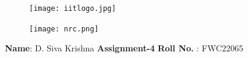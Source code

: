 \documentclass[10pt,a4paper]{report}
\begin{document}
\begin{figure}[!tbp]
  \centering
  \begin{minipage}[b]{0.4\textwidth}
    \texttt{[image: iitlogo.jpg]}
  \end{minipage}
  \hfill
  \vspace{5mm}\begin{minipage}[b]{0.4\textwidth}
\raggedleft  \texttt{[image: nrc.png]}\

  \end{minipage}\vspace{0.2cm}
\end{figure}
\raggedright \textbf{Name}:\hspace{1mm} D. Siva Krishna\hspace{3cm} \Large \textbf{Assignment-4}\hspace{2.5cm} %
\normalsize \textbf{Roll No.} :\hspace{1mm} FWC22065\vspace{1cm}
\end{document}
